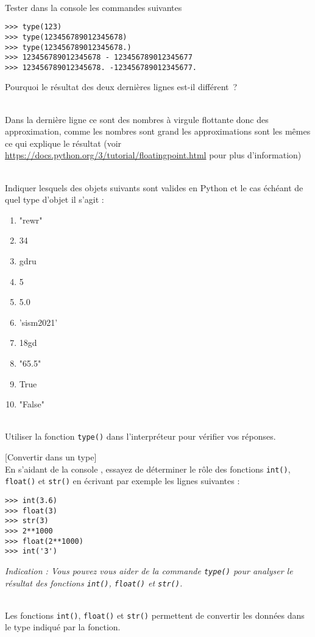 \documentclass[a4paper,12pt]{article}
\begin{document}
\exo{}  ~\\ 
Tester dans la console \py les commandes suivantes
\begin{lstlisting}[numbers=none]
>>> type(123)
>>> type(123456789012345678)
>>> type(123456789012345678.)
>>> 123456789012345678 - 123456789012345677
>>> 123456789012345678. -123456789012345677.
\end{lstlisting}

Pourquoi le résultat des deux dernières lignes est-il différent ?
	\begin{correction}
		~\\ 
		Dans la dernière ligne ce sont des nombres à virgule flottante donc des approximation, comme les nombres sont grand les approximations sont les mêmes ce qui explique le résultat (voir \url{https://docs.python.org/3/tutorial/floatingpoint.html} pour plus d'information)
	\end{correction}
\finexo

\exo{}  ~\\ 
Indiquer lesquels des objets suivants sont valides en Python et le cas échéant de quel type d'objet il s'agit :
\begin{multicols}{2}
	\begin{enumerate}[label=\alph*)]
		\item "rewr"
		\item 34
		\item gdru
		\item 5
		\item 5.0
		\item 'sism2021'
		\item 18gd
		\item "65.5"
		\item True
		\item "False"
	\end{enumerate}
\end{multicols}
	\begin{correction}
	~\\ 
	Utiliser la fonction \lstinline{type()} dans l'interpréteur \py pour vérifier vos réponses.
\end{correction}
\finexo

\newpage

\exo{}[Convertir dans un type]  ~\\ 
 En s'aidant de la console \py, essayez de déterminer le rôle des fonctions \lstinline{int()},
\lstinline{float()} et \lstinline{str()} en écrivant par exemple les lignes suivantes :
\begin{lstlisting}[numbers=none]
>>> int(3.6)
>>> float(3)
>>> str(3)
>>> 2**1000
>>> float(2**1000)
>>> int('3')
\end{lstlisting}
\vspace{0.3cm}
\textit{Indication : Vous pouvez vous aider de la commande \lstinline{type()} pour analyser le résultat des fonctions \lstinline{int()}, \lstinline{float()} et \lstinline{str()}.}
	\begin{correction}
	~\\ 
	Les fonctions \lstinline{int()}, \lstinline{float()} et \lstinline{str()} permettent de convertir les données dans le type indiqué par la fonction.
\end{correction}
\finexo
\end{document}
